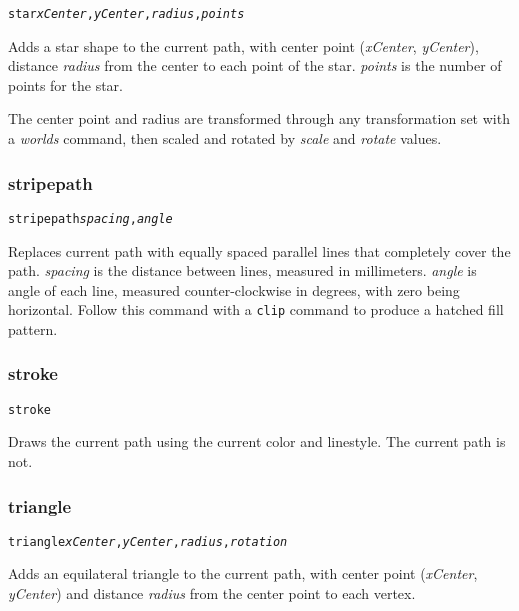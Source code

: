\begin{alltt}
star \textit{xCenter}, \textit{yCenter}, \textit{radius}, \textit{points}
\end{alltt}

Adds a star shape to the current path, with center
point (\textit{xCenter}, \textit{yCenter}), distance
\textit{radius}
from the center to each point of the star.
\textit{points} is the number of points for the star.

The center point and radius are transformed through any
transformation set with a \textit{worlds} command,
then scaled and rotated by \textit{scale}
and \textit{rotate} values.

\subsubsection{stripepath}

\begin{alltt}
stripepath \textit{spacing}, \textit{angle}
\end{alltt}

Replaces current path with equally spaced parallel lines that completely cover
the path.  \textit{spacing} is the distance between lines, measured in
millimeters.  \textit{angle} is angle of each line, measured
counter-clockwise in degrees, with zero being horizontal.  Follow this command
with a \texttt{clip} command to produce a hatched fill pattern.

\subsubsection{stroke}

\begin{alltt}
stroke
\end{alltt}

Draws the current path using the current color and linestyle.
The current path is not.

\subsubsection{triangle}

\begin{alltt}
triangle \textit{xCenter}, \textit{yCenter}, \textit{radius}, \textit{rotation}
\end{alltt}

Adds an equilateral triangle to the current path, with center
point (\textit{xCenter}, \textit{yCenter}) and distance
\textit{radius}
from the center point to each vertex.

